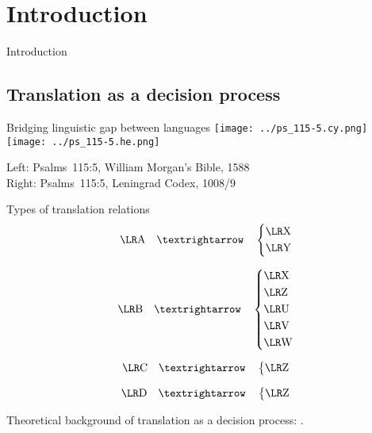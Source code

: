 \setcounter{section}{-1}
\section{Introduction}

\begin{frame}{}
	\begin{center}
		Introduction
	\end{center}
\end{frame}



\subsection{Translation as a decision process}

\begin{frame}{Bridging linguistic gap between languages}
	\texttt{[image: ../ps\_115-5.cy.png]}
	\hfill
	\texttt{[image: ../ps\_115-5.he.png]}

	\vfill

	Left: Psalms~115:5, William Morgan’s Bible, 1588\\
	Right: Psalms~115:5, Leningrad Codex, 1008/9
\end{frame}



\begin{frame}{\hopoint Types of translation relations}
	$$
	\mtext{A} \transto
	\begin{dcases}
		\mtext{X}\\
		\mtext{Y}
	\end{dcases}
	$$

	$$
	\mtext{B} \transto
	\begin{dcases}
		\mtext{X}\\
		\mtext{Z}\\
		\mtext{U}\\
		\mtext{V}\\
		\mtext{W}
	\end{dcases}
	$$

	$$
	\mtext{C} \transto
	\begin{dcases}
		\mtext{Z}
	\end{dcases}
	$$

	$$
	\mtext{D} \transto
	\begin{dcases}
		\mtext{Z}
	\end{dcases}
	$$

	{\footnotesize Theoretical background of translation as a decision process: \cite{levy.j:1967:translation}.}
\end{frame}



